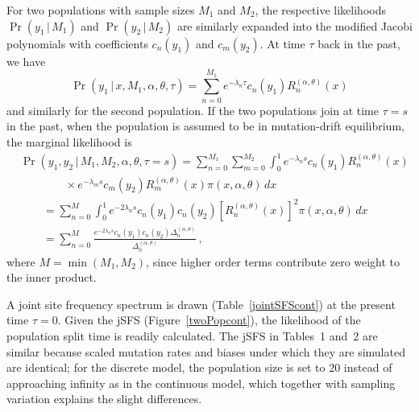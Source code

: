 \documentclass[preprint]{elsarticle}
\newcommand\given{{\,|\,}}
\newcommand\y{\ensuremath{y}}
\begin{document}
For two populations with sample sizes $M_1$ and $M_2$, the respective likelihoods $\Pr(\y_1\given M_1)$ and $\Pr(\y_2\given M_2)$ are similarly expanded into the modified Jacobi polynomials with coefficients $c_n(\y_1)$ and $c_m(\y_2)$. At time $\tau$ back in the past, we have
\begin{equation}
    \Pr(\y_1\given x, M_1,\alpha,\theta,\tau)=
    \sum_{n=0}^{M_1} e^{-\lambda_n\tau}c_n(\y_1)R_n^{(\alpha,\theta)}(x)
\end{equation}
and similarly for the second population. If the two populations join at time $\tau=s$ in the past, when the population is assumed to be in mutation-drift equilibrium, the marginal likelihood is
\begin{equation}
\begin{split}
    &\Pr(\y_1,\y_2\given M_1,M_2,\alpha,\theta, \tau=s)=
    \sum_{n=0}^{M_1}\sum_{m=0}^{M_2}\int_0^1 e^{-\lambda_n s}c_n(\y_1)R_n^{(\alpha,\theta)}(x)\\
    &\qquad\qquad\times e^{-\lambda_m s}c_m(\y_2) R_m^{(\alpha,\theta)}(x)\pi(x,\alpha,\theta)  \,dx\\
    &\qquad=
    \sum_{n=0}^{M}\int_0^1 e^{-2\lambda_n s}c_n(\y_1)c_n(\y_2) \left[R_n^{(\alpha,\theta)}(x)\right]^2\pi(x,\alpha,\theta)  \,dx\\
    &\qquad=\sum_{n=0}^{M}\frac{e^{-2\lambda_n s}c_n(\y_1) c_n(\y_2)\Delta_n^{(\alpha,\theta)}}{\Delta_0^{(\alpha,\theta)}}\,,
\end{split}
\end{equation}
where $M=\min(M_1,M_2)$, since higher order terms contribute zero weight to the inner product. 

A joint site frequency spectrum is drawn (Table~\ref{jointSFScont}) at the present time $\tau=0$. Given the jSFS (Figure~\ref{twoPopcont}), the likelihood of the population split time is readily calculated. The jSFS in Tables~1 and~2 are similar because scaled mutation rates and biases under which they are simulated are identical; for the discrete model, the population size is set to $20$  instead of approaching infinity as in the continuous model, which together with sampling variation explains the slight differences.
\end{document}
